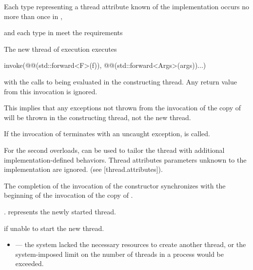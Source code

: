 \documentclass{wg21}
\begin{document}
\begin{itemdescr}
\begin{addedblock}
Each type representing a thread attribute known of the implementation occurs no more than once in ,
\end{addedblock}

\pnum
\expects
{} and each type in  meet the
 requirements

\pnum
\effects
The new thread of execution executes
\begin{codeblock}
    invoke(@@(std::forward<F>(f)), @@(std::forward<Args>(args))...)
\end{codeblock}
with the calls to
 being evaluated in the constructing thread.
Any return value from this invocation is ignored.
\begin{note}
    This implies that any exceptions not thrown from the invocation of the copy
    of  will be thrown in the constructing thread, not the new thread.
\end{note}
If the invocation of  terminates with an uncaught exception,
 is called.

\begin{addedblock}
For the second overloads,  can be used to tailor the thread with additional implementation-defined behaviors. Thread attributes parameters unknown to the implementation are ignored. (see [thread.attributes]).
\end{addedblock}

\pnum
\sync
The completion of the invocation of the constructor
synchronizes with the beginning of the invocation of the copy of .

\pnum
\ensures
{}.  represents the newly started thread.

\pnum
\throws
{} if unable to start the new thread.

\pnum
\errors
\begin{itemize}
    \item {} --- the system lacked the necessary
    resources to create another thread, or the system-imposed limit on the number of
    threads in a process would be exceeded.
\end{itemize}
\end{itemdescr}

\section{}
\end{document}

